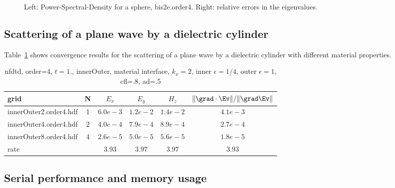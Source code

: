 \begin{figure}
\begin{center}
\end{center}
\caption{Left: Power-Spectral-Density for a sphere, bis2e.order4. Right: relative errors in the eigenvalues.}
\label{tab:eigSphere}
\end{figure}


\clearpage
\subsection{Scattering of a plane wave by a dielectric cylinder}

Table~\ref{table:mx.innerOuter} shows convergence results for the scattering of a plane
wave by a dielectric cylinder with different material properties.

\begin{table}[hbt]
\begin{center}
\begin{tabular}{|l|c|c|c|c|c|} \hline\hline 
grid  & N &  $E_x$ &  $E_y$ & $H_z$ & $\|\grad\cdot\Ev\|/\|\grad\Ev\|$\\ \hline 
innerOuter2.order4.hdf &     1 &$6.0 e-3$ &$1.2 e-2$ &$1.4 e-2$ &$4.1 e-3$  \\ \hline
innerOuter4.order4.hdf &     2 &$4.0 e-4$ &$7.9 e-4$ &$8.9 e-4$ &$2.7 e-4$  \\ \hline
innerOuter8.order4.hdf &     4 &$2.6 e-5$ &$5.0 e-5$ &$5.6 e-5$ &$1.8 e-5$  \\ \hline
    rate            &     &       $3.93$ &       $3.97$ &       $3.97$ &       $3.93$  \\ \hline\hline
\end{tabular}
\caption{nfdtd, order=$4$, $t=1.$, innerOuter, material interface, $k_x=2$, inner $\epsilon=1/4$,
   outer $\epsilon=1$, cfl=.8, ad=.5}\label{table:mx.innerOuter}
\end{center}
\end{table}


\clearpage
\subsection{Serial performance and memory usage}


